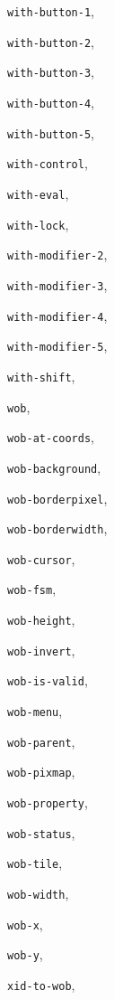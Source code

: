 \begin{theindex}
\item {\tt with-button-1}, {\bf\pageref{with-button-N}}
\item {\tt with-button-2}, {\bf\pageref{with-button-N}}
\item {\tt with-button-3}, {\bf\pageref{with-button-N}}
\item {\tt with-button-4}, {\bf\pageref{with-button-N}}
\item {\tt with-button-5}, {\bf\pageref{with-button-N}}
\item {\tt with-control}, {\bf\pageref{with-control}}
\item {\tt with-eval}, {\bf\pageref{with-eval}}
\item {\tt with-lock}, {\bf\pageref{with-lock}}
\item {\tt with-modifier-2}, {\bf\pageref{with-modifier-N}}
\item {\tt with-modifier-3}, {\bf\pageref{with-modifier-N}}
\item {\tt with-modifier-4}, {\bf\pageref{with-modifier-N}}
\item {\tt with-modifier-5}, {\bf\pageref{with-modifier-N}}
\item {\tt with-shift}, {\bf\pageref{with-shift}}
\item {\tt wob}, {\bf\pageref{wob}}
\item {\tt wob-at-coords}, {\bf\pageref{wob-at-coords}}
\item {\tt wob-background}, {\bf\pageref{wob-background}}
\item {\tt wob-borderpixel}, {\bf\pageref{wob-borderpixel}}
\item {\tt wob-borderwidth}, {\bf\pageref{wob-borderwidth}}
\item {\tt wob-cursor}, {\bf\pageref{wob-cursor}}
\item {\tt wob-fsm}, {\bf\pageref{wob-fsm}}
\item {\tt wob-height}, {\bf\pageref{wob-height}}
\item {\tt wob-invert}, {\bf\pageref{wob-invert}}
\item {\tt wob-is-valid}, {\bf\pageref{wob-is-valid}}
\item {\tt wob-menu}, {\bf\pageref{wob-menu}}
\item {\tt wob-parent}, {\bf\pageref{wob-parent}}
\item {\tt wob-pixmap}, {\bf\pageref{wob-pixmap}}
\item {\tt wob-property}, {\bf\pageref{wob-property}}
\item {\tt wob-status}, {\bf\pageref{wob-status}}
\item {\tt wob-tile}, {\bf\pageref{wob-tile}}
\item {\tt wob-width}, {\bf\pageref{wob-width}}
\item {\tt wob-x}, {\bf\pageref{wob-x}}
\item {\tt wob-y}, {\bf\pageref{wob-y}}
\item {\tt xid-to-wob}, {\bf\pageref{xid-to-wob}}
\end{theindex}
